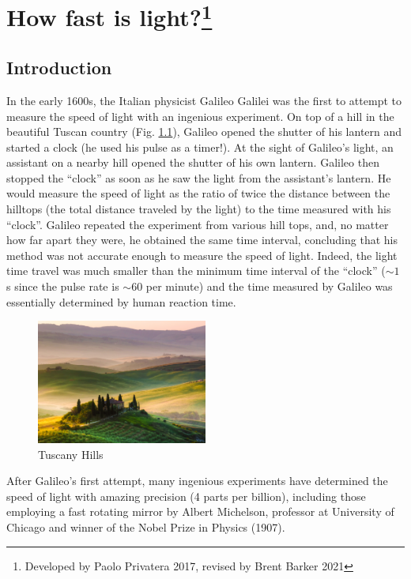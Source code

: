 \chapter[How fast is light?]{How fast is light?\footnote{Developed by Paolo Privatera 2017, revised by Brent Barker 2021}}


\section{Introduction}

In the early 1600s, the Italian physicist Galileo Galilei was the first to attempt to measure the speed of light with an ingenious experiment. On top of a hill in the beautiful Tuscan country (Fig. \ref{sol:fig:tuscany}), Galileo opened the shutter of his lantern and started a clock (he used his pulse as a timer!).  At the sight of Galileo’s light, an assistant on a nearby hill opened the shutter of his own lantern. Galileo then stopped the “clock” as soon as he saw the light from the assistant’s lantern. He would measure the speed of light as the ratio of twice the distance between the hilltops (the total distance traveled by the light) to the time measured with his “clock”.  Galileo repeated the experiment from various hill tops, and, no matter how far apart they were, he obtained the same time interval, concluding that his method was not accurate enough to measure the speed of light. Indeed, the light time travel was much smaller than the minimum time interval of the  “clock” ($\sim 1\:$s since the pulse rate is $\sim 60$ per minute) and the time measured by Galileo was essentially determined by human reaction time.

\begin{figure}
	\centering
	\includegraphics[width=0.5\textwidth]{speed-of-light/tuscany.png}
	\caption{Tuscany Hills}\label{sol:fig:tuscany}
\end{figure}

After Galileo’s first attempt, many ingenious experiments have determined the speed of light with amazing precision (4 parts per billion), including those employing a fast rotating mirror by Albert Michelson, professor at University of Chicago and winner of the Nobel Prize in Physics (1907).   

